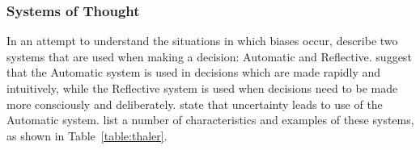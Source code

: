\documentclass[a4paper]{scrartcl}     %
\begin{document}







    \subsubsection{Systems of Thought}

      In an attempt to understand the situations in which biases occur, \citet{Kahneman2012} describe two systems that are used when making a decision: Automatic and Reflective. \citet{Thaler2012} suggest that the Automatic system is used in decisions which are made rapidly and intuitively, while the Reflective system is used when decisions need to be made more consciously and deliberately.  \citet{Kahneman2012} state that uncertainty leads to use of the Automatic system. \citeauthor{Thaler2012} list a number of characteristics and examples of these systems, as shown in Table~\ref{table:thaler}.
\end{document}
